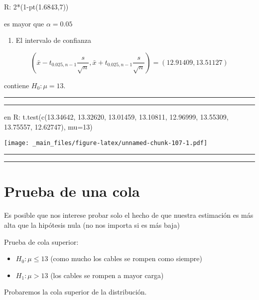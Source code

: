 \documentclass[
]{book}
\providecommand{\tightlist}{%
  \setlength{\itemsep}{0pt}\setlength{\parskip}{0pt}}
\begin{document}
R: 2*(1-pt(1.6843,7))

es mayor que \(\alpha=0.05\)

\begin{enumerate}
\def\labelenumi{\arabic{enumi}.}
\setcounter{enumi}{2}
\tightlist
\item
  El intervalo de confianza
\end{enumerate}

\[(\bar{x}-t_{0.025, n-1} \frac{s}{\sqrt{n}}, \bar{x}+t_{0.025, n-1} \frac{s}{ \sqrt{n}})=(12.91409, 13.51127)\]

contiene \(H_0:\mu=13\).

\begin{center}\rule{0.5\linewidth}{0.5pt}\end{center}

\begin{center}\rule{0.5\linewidth}{0.5pt}\end{center}

en R:
t.test(c(13.34642, 13.32620, 13.01459, 13.10811,
12.96999, 13.55309, 13.75557, 12.62747), mu=13)

\texttt{[image: \_main\_files/figure-latex/unnamed-chunk-107-1.pdf]}

\begin{center}\rule{0.5\linewidth}{0.5pt}\end{center}

\begin{center}\rule{0.5\linewidth}{0.5pt}\end{center}

\hypertarget{prueba-de-una-cola}{%
\section{Prueba de una cola}\label{prueba-de-una-cola}}

Es posible que nos interese probar solo el hecho de que nuestra estimación es más alta que la hipótesis nula (no nos importa si es más baja)

Prueba de cola superior:

\begin{itemize}
\tightlist
\item
  \(H_0:\mu \leq 13\) (como mucho los cables se rompen como siempre)
\item
  \(H_1:\mu > 13\) (los cables se rompen a mayor carga)
\end{itemize}

Probaremos la cola superior de la distribución.
\end{document}
